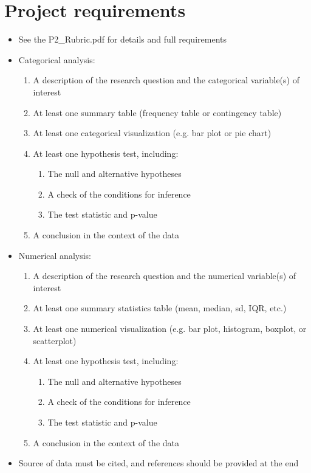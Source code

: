 \documentclass[12pt]{article}
\begin{document}
\section*{Project requirements}
\begin{itemize}
    \item See the P2\_Rubric.pdf for details and full requirements
    \item Categorical analysis:
    \begin{enumerate}
        \item A description of the research question and the categorical variable(s) of interest
        \item At least one summary table (frequency table or contingency table)
        \item At least one categorical visualization (e.g. bar plot or pie chart)
        \item At least one hypothesis test, including:
        \begin{enumerate}
            \item The null and alternative hypotheses
            \item A check of the conditions for inference
            \item The test statistic and p-value
        \end{enumerate}
        \item A conclusion in the context of the data
    \end{enumerate}
    \item Numerical analysis:
    \begin{enumerate}
        \item A description of the research question and the numerical variable(s) of interest
        \item At least one summary statistics table (mean, median, sd, IQR, etc.)
        \item At least one numerical visualization (e.g. bar plot, histogram, boxplot, or scatterplot)
        \item At least one hypothesis test, including:
        \begin{enumerate}
            \item The null and alternative hypotheses
            \item A check of the conditions for inference
            \item The test statistic and p-value
        \end{enumerate}
        \item A conclusion in the context of the data
    \end{enumerate}
    \item Source of data must be cited, and references should be provided at the end
\end{itemize}
\end{document}
